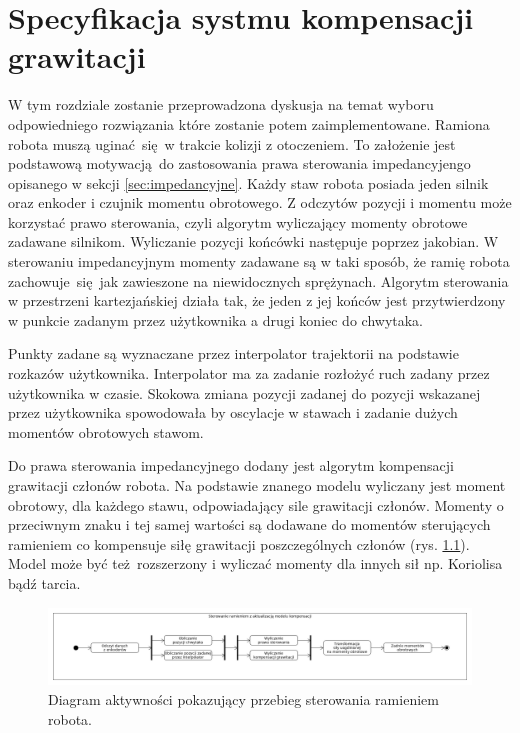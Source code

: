 
\chapter{Specyfikacja systmu kompensacji grawitacji\label{chap:implementacja_systemu}}
W tym rozdziale zostanie przeprowadzona dyskusja na temat wyboru odpowiedniego rozwiązania które zostanie potem zaimplementowane. Ramiona robota muszą uginać się w trakcie kolizji z otoczeniem. To założenie jest podstawową motywacją do zastosowania prawa sterowania impedancyjengo opisanego w sekcji \ref{sec:impedancyjne}. Każdy staw robota posiada jeden silnik oraz enkoder i czujnik momentu obrotowego. Z odczytów pozycji i momentu może korzystać prawo sterowania, czyli algorytm wyliczający momenty obrotowe zadawane silnikom. Wyliczanie pozycji końcówki następuje poprzez jakobian. W sterowaniu impedancyjnym momenty zadawane są w taki sposób, że ramię robota zachowuje się jak zawieszone na niewidocznych sprężynach. Algorytm sterowania w przestrzeni kartezjańskiej działa tak, że jeden z jej końców jest przytwierdzony w punkcie zadanym przez użytkownika a drugi koniec do chwytaka. 

Punkty zadane są wyznaczane przez interpolator trajektorii na podstawie rozkazów użytkownika. Interpolator ma za zadanie rozłożyć ruch zadany przez użytkownika w czasie. Skokowa zmiana pozycji zadanej do pozycji wskazanej przez użytkownika spowodowała by oscylacje w stawach i zadanie dużych momentów obrotowych stawom.

Do prawa sterowania impedancyjnego dodany jest algorytm kompensacji grawitacji członów robota. Na podstawie znanego modelu wyliczany jest moment obrotowy, dla każdego stawu, odpowiadający sile grawitacji członów. Momenty o przeciwnym znaku i tej samej wartości są dodawane do momentów sterujących ramieniem co kompensuje siłę grawitacji poszczególnych członów (rys. \ref{fig:sterowanie}). Model może być też rozszerzony i wyliczać momenty dla innych sił np. Koriolisa bądź tarcia.

\begin{figure}
	\centering
	\includegraphics[width=.99\textwidth]{images/kompensacja.png}
	\caption{Diagram aktywności pokazujący przebieg sterowania ramieniem robota.}
	\label{fig:sterowanie}
\end{figure}

